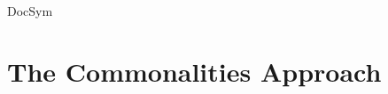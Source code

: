 \begin{copiedFrom}{DocSym}


\end{copiedFrom} %


\section{The Commonalities Approach}
\label{chap:commonalities:approach}

